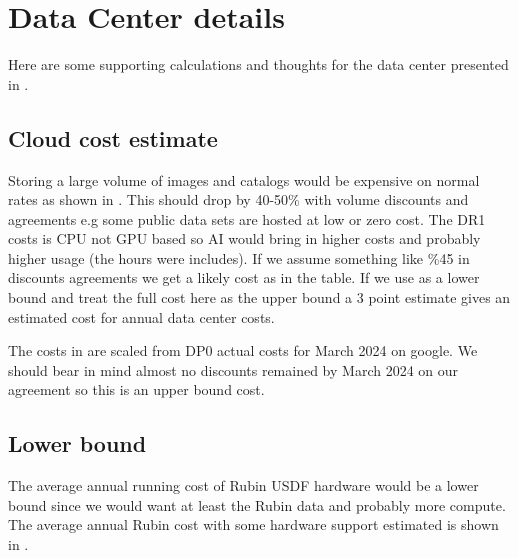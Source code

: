 \section{Data Center details} \label{sec:dcdetail}
Here are some supporting calculations and thoughts for the data center presented in .


\subsection{Cloud cost estimate}\label{dec:cloudcost}
Storing a large volume of images and catalogs would be expensive on normal rates as shown in .
This should drop by 40-50\% with volume discounts and agreements e.g some public data sets are hosted at low or zero cost.
The DR1 costs is CPU not GPU based so AI would bring in higher costs and probably higher usage (the hours were includes).
If we assume something like \%45 in discounts agreements we get a likely cost as in the table.
If we use  as a lower bound and treat the full cost here as the upper bound a 3 point estimate gives an estimated cost for annual data center costs.



The costs in  are scaled from DP0 actual costs for March 2024 on google.
We should bear in mind almost no discounts remained by March 2024 on our agreement so this is an upper bound cost.



\subsection{Lower bound}
The average annual running cost of Rubin USDF hardware would be a lower bound since we would want at least the Rubin data and probably more compute.
The average annual Rubin cost with some hardware support estimated is shown in .



